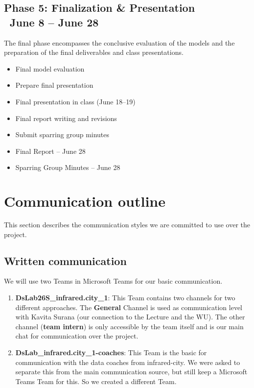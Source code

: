 \documentclass[12pt]{article}
\begin{document}
\subsection[Phase 5: Finalization \& Presentation]{Phase 5: Finalization \& Presentation \\ \normalsize\ June 8 – June 28}
The final phase encompasses the conclusive evaluation of the models and the preparation of the final deliverables and class presentations.

\begin{description}[style=multiline, leftmargin=3cm, font=\normalfont\textbf]
    \item[Tasks:] 
    \begin{itemize}[nosep, leftmargin=*]
        \item Final model evaluation
        \item Prepare final presentation
        \item Final presentation in class (June 18–19)
        \item Final report writing and revisions
        \item Submit sparring group minutes
    \end{itemize}
    \item[Deliverables:] 
    \begin{itemize}[nosep, leftmargin=*]
        \item Final Report -- June 28
        \item Sparring Group Minutes -- June 28
    \end{itemize}
\end{description}


\section{Communication outline}

This section describes the communication styles we are committed to use over the project.

\subsection{Written communication}

We will use two Teams in Microsoft Teams for our basic communication.

\begin{enumerate}
    \item \textbf{DsLab26S\_infrared.city\_1}: This Team contains two channels for two different approaches. The \textbf{General} Channel is used as communication level with Kavita Surana (our connection to the Lecture and the WU). The other channel (\textbf{team intern}) is only accessible by the team itself and is our main chat for communication over the project.
    \item \textbf{DsLab\_infrared.city\_1-coaches}: This Team is the basic for communication with the data coaches from infrared-city. We were asked to separate this from the main communication source, but still keep a Microsoft Teams Team for this. So we created a different Team.
\end{enumerate}
\end{document}
